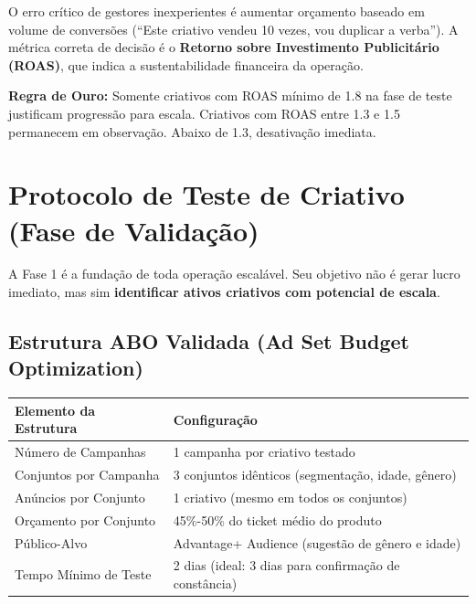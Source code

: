 \documentclass[12pt, a4paper]{article}
\begin{document}
O erro crítico de gestores inexperientes é aumentar orçamento baseado em volume de conversões (``Este criativo vendeu 10 vezes, vou duplicar a verba''). A métrica correta de decisão é o \textbf{Retorno sobre Investimento Publicitário (ROAS)}, que indica a sustentabilidade financeira da operação.

\textcolor{accentColor}{\textbf{Regra de Ouro:}} Somente criativos com ROAS mínimo de 1.8 na fase de teste justificam progressão para escala. Criativos com ROAS entre 1.3 e 1.5 permanecem em observação. Abaixo de 1.3, desativação imediata.

\needspace{8cm}

\section{Protocolo de Teste de Criativo (Fase de Validação)}

A Fase 1 é a fundação de toda operação escalável. Seu objetivo não é gerar lucro imediato, mas sim \textbf{identificar ativos criativos com potencial de escala}.

\subsection{Estrutura ABO Validada (Ad Set Budget Optimization)}

\begin{table}[H]
    \centering
    \renewcommand{\arraystretch}{1.4}
    \begin{tabularx}{\textwidth}{X X}
        \toprule
        \rowcolor{tableHeader} \textbf{Elemento da Estrutura} & \textbf{Configuração} \\
        \midrule
        Número de Campanhas & 1 campanha por criativo testado \\
        \rowcolor{lightGray}
        Conjuntos por Campanha & 3 conjuntos idênticos (segmentação, idade, gênero) \\
        Anúncios por Conjunto & 1 criativo (mesmo em todos os conjuntos) \\
        \rowcolor{lightGray}
        Orçamento por Conjunto & 45\%-50\% do ticket médio do produto \\
        Público-Alvo & Advantage+ Audience (sugestão de gênero e idade) \\
        \rowcolor{lightGray}
        Tempo Mínimo de Teste & 2 dias (ideal: 3 dias para confirmação de constância) \\
        \bottomrule
    \end{tabularx}
\end{table}
\end{document}
